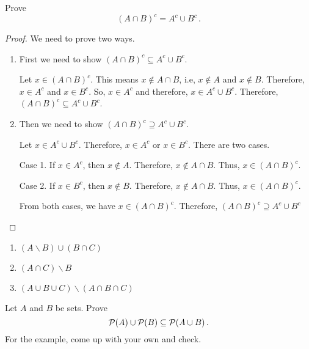 \documentclass[12pt]{amsart}
\begin{document}
\begin{problem}[Exercise 3.12]
Prove
\begin{equation*}
	( A \cap B)^c = A^c \cup B^c \,.
\end{equation*}
\end{problem}
\begin{proof}
	We need to prove two ways.
	\begin{enumerate}[1.]
		\item First we need to show $ ( A \cap B)^c \subseteq A^c \cup B^c $.

		      Let $x \in (A \cap B)^c$.
		      This means $ x \not\in A \cap B$, i.e,
		      $x \not \in A$ and $x \not \in B$.
		      Therefore, $x\in A^c$ and $x \in B^c$.
		      So, $x \in A^c$ and therefore, $x \in A^c \cup B^c$.
		      Therefore, $ ( A \cap B)^c \subseteq A^c \cup B^c $.
		      \\
		\item Then we need to show $ ( A \cap B)^c \supseteq A^c \cup B^c $.

		      Let $x \in A^c \cup B^c$.
		      Therefore, $x \in A^c$ or $x \in B^c$. There are two cases.

		      Case 1. If $x \in A^c$, then $x \not\in A$. Therefore,
		      $x \not\in A \cap B$. Thus, $x\in (A \cap B)^c$.

		      Case 2. If $x \in B^c$, then $x \not\in B$. Therefore,
		      $x \not\in A \cap B$. Thus, $x\in (A \cap B)^c$.

		      From both cases, we have
		      $x\in (A \cap B)^c$.
		      Therefore, $ ( A \cap B)^c \supseteq A^c \cup B^c $
	\end{enumerate}
\end{proof}


\begin{problem}[Exercise 3.14]
\begin{enumerate}
	\item $(A \backslash B) \cup (B \cap C)$
	\item $  (A \cap C ) \backslash B $
	\item $(A \cup B \cup C ) \backslash (A \cap B \cap C) $
\end{enumerate}
\end{problem}

\begin{problem}[Exercise 3.15]
Let $A$ and $B$ be sets. Prove
\begin{equation*}
	\mathcal{P}(A) \cup \mathcal{P}(B) \subseteq \mathcal{P}(A \cup B) \,.
\end{equation*}
For the example, come up with your own and check.
\end{problem}
\end{document}
